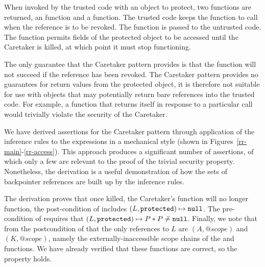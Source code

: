 \documentclass[a4paper,notitlepage]{report}
\begin{document}
When invoked by the trusted code with an object to protect, two functions are
returned, an  function and a  function. The trusted code keeps the
 function to call when the reference is to be revoked. The  function
is passed to the untrusted code.
The  function permits fields of the protected object to be accessed until
the Caretaker is killed, at which point it must stop functioning.

The only guarantee that the Caretaker pattern provides is that the 
function will not succeed if the reference has been revoked.
The Caretaker pattern provides no guarantees for return values from
the protected object, it is therefore not suitable for use with objects that may
potentially return bare references into the trusted code.
For example, a function that returns itself in response to a
particular call would trivially violate the security of the Caretaker.

We have derived assertions for the Caretaker pattern through application of the
inference rules to the expressions in a mechanical style (shown in
Figures~\ref{rr-main}-\ref{rr-access}). This approach produces
a significant number of assertions, of which only a few are relevant to the
proof of the trivial security property. Nonetheless, the derivation is a
useful demonstration of how the sets of backpointer references are built up by
the inference rules. 

The derivation proves that once killed, the Caretaker's  function will no
longer function, the post-condition of  includes $(L, \mathtt{protected})
\mapsto \mathtt{null}$. The pre-condition of  requires that $(L,
\mathtt{protected}) \mapsto P \mathbin{*} P \not\doteq \mathtt{null}$. Finally, we note that from
the postcondition of  that the only references to $L$ are
$(A, @scope)$ and $(K, @scope)$, namely the externally-inaccessible scope chains
of the  and  functions. We have already verified that these
functions are correct, so the property holds.
\end{document}
